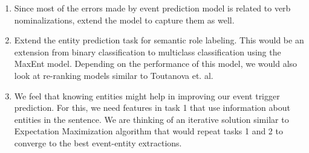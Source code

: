 \begin{enumerate}
\item Since most of the errors made by event prediction model is related to verb nominalizations, extend the model to capture them as well.
\item Extend the entity prediction task for semantic role labeling. This would be an extension from binary classification to multiclass classification using the MaxEnt model. Depending on the performance of this model, we would also look at re-ranking models similar to Toutanova et. al.
\item We feel that knowing entities might help in improving our event trigger prediction. For this, we need features in task 1 that use information about entities in the sentence. We are thinking of an iterative solution similar to Expectation Maximization algorithm that would repeat tasks 1 and 2 to converge to the best event-entity extractions.
\end{enumerate}